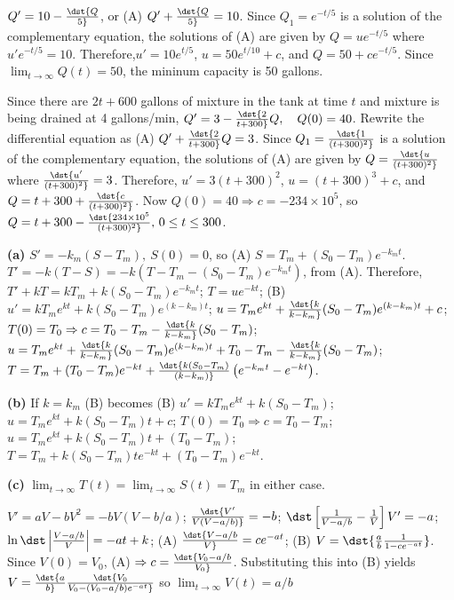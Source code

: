 \documentclass[dvips]{book}
\renewcommand{\exer}[1]{\par\medskip\;\noindent{\color{red}\bf #1.}}
\numberwithin{example}{section}
\numberwithin{equation}{section}
\numberwithin{theorem}{section}
\numberwithin{table}{section}
\numberwithin{figure}{section}
\begin{document}
\exer{4.2.12}
$Q'=10-\dst{Q\over5}$, or
 (A) $Q'+\dst{Q\over5}=10$. Since $Q_1=e^{-t/5}$ is a solution
of the complementary equation, the solutions of (A) are given by
$Q=ue^{-t/5}$ where $u'e^{-t/5}=10$. Therefore,$u'=10e^{t/5}$,
$u=50e^{t/10}+c$, and $Q=50+ce^{-t/5}$. Since
$\lim_{t\to\infty}Q(t)=50$, the mininum capacity is 50 gallons.



\exer{4.2.14}
 Since there are $2t+600$ gallons of mixture in the tank at
time $t$ and mixture is being drained at 4
gallons/min, $Q'=3-\dst{2\over t+300}Q,\quad Q(0)=40$.
 Rewrite the differential
equation
as (A) $Q'+\dst{2\over t+300}Q=3$. Since $Q_1=\dst{1\over(t+300)^2}$
is a
solution of the complementary equation, the solutions of (A) are given
by
$Q=\dst{u\over(t+300)^2}$ where $\dst{u'\over(t+300)^2}=3$. Therefore,
$u'=3(t+300)^2$,
$u=(t+300)^3+c$, and $Q=t+300+\dst{c\over(t+300)^2}$.
 Now
$Q(0)=40\Rightarrow c=-234\times10^5$, so
 $Q= t+300-\dst{234 \times 10^5\over(t+300)^2},
\, 0\le t\le300$.



\exer{4.2.16}
{\bf (a)} $S'=-k_m(S-T_m),\ S(0)=0$, so (A)
$S=T_m+(S_0-T_m)e^{-k_mt}$.
$T'=-k(T-S)=-k\left(T-T_m-(S_0-T_m)e^{-k_mt}\right)$,
from
(A). Therefore,$T'+kT=kT_m+k(S_0-T_m)e^{-k_mt}$; $T=ue^{-kt}$;
(B) $u'=kT_me^{kt}+k(S_0-T_m)e^{(k-k_m)t}$;
 $u=T_me^{kt}+\dst{k\over
k-k_m}(S_0-T_m)e^{(k-k_m)t}+c$;
 $T(0)=T_0\Rightarrow
 c=T_0-T_m-\dst{k\over k-k_m}(S_0-T_m)$;
 $u=T_me^{kt}+\dst{k\over
k-k_m}(S_0-T_m)e^{(k-k_m)t}+T_0-T_m-\dst{k\over k-k_m}(S_0-T_m)$;
$T=T_m+(T_0-T_m)e^{-kt}+\dst{k(S_0-T_m)\over
(k-k_m)}\left(e^{-k_mt}-e^{-kt}\right)$.

{\bf (b)} If $k=k_m$ (B) becomes
(B) $u'=kT_me^{kt}+k(S_0-T_m)$; $u=T_me^{kt}+k(S_0-T_m)t+c$;
$T(0)=T_0\Rightarrow c=T_0-T_m$;
$u=T_me^{kt}+k(S_0-T_m)t+(T_0-T_m)$;
$T=T_m+k(S_0-T_m)te^{-kt}+(T_0-T_m)e^{-kt}$.

{\bf (c)} $\lim_{t\to\infty}T(t)=\lim_{t\to\infty}S(t)=T_m$
in either  case.


\exer{4.2.18}
$V'=aV-bV^2=-bV(V-b/a)$; $\dst{V'\over V(V-a/b)}=-b$;
$\dst\left[{1\over V-a/b}-{1\over V}\right]V'=-a$;
$\ln\dst\left|V-a/b\over V\right|=-at+k$; (A) $\dst{V-a/b\over
V}=ce^{-at}$; (B) $V=\dst{{a\over b}{1\over1-ce^{-at}}}$. Since
$V(0)=V_0$,  (A) $\Rightarrow c=\dst{V_0-a/b\over V_0}$. Substituting
this into (B) yields
$V=\dst{a\over b}\dst{V_0\over V_0-\left(V_0-a/b
\right)e^{-at}}$ so $\lim_{t\to\infty}V(t)=a/b$
\end{document}
